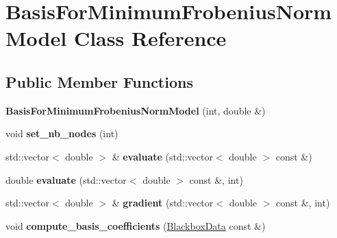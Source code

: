 \hypertarget{class_basis_for_minimum_frobenius_norm_model}{}\section{Basis\+For\+Minimum\+Frobenius\+Norm\+Model Class Reference}
\label{class_basis_for_minimum_frobenius_norm_model}
\subsection*{Public Member Functions}
\begin{DoxyCompactItemize}
\item 
{\bfseries Basis\+For\+Minimum\+Frobenius\+Norm\+Model} (int, double \&)\hypertarget{class_basis_for_minimum_frobenius_norm_model_a58e929c983576359f847821fc6701ed8}{}\label{class_basis_for_minimum_frobenius_norm_model_a58e929c983576359f847821fc6701ed8}

\item 
void {\bfseries set\+\_\+nb\+\_\+nodes} (int)\hypertarget{class_basis_for_minimum_frobenius_norm_model_ac3d25a58d68b00f1e71813ef3d55bfb5}{}\label{class_basis_for_minimum_frobenius_norm_model_ac3d25a58d68b00f1e71813ef3d55bfb5}

\item 
std\+::vector$<$ double $>$ \& {\bfseries evaluate} (std\+::vector$<$ double $>$ const \&)\hypertarget{class_basis_for_minimum_frobenius_norm_model_aee6e23df4a21b2d3e8c02d912a25f603}{}\label{class_basis_for_minimum_frobenius_norm_model_aee6e23df4a21b2d3e8c02d912a25f603}

\item 
double {\bfseries evaluate} (std\+::vector$<$ double $>$ const \&, int)\hypertarget{class_basis_for_minimum_frobenius_norm_model_a50c9c4b6700154f3e0b8cf92d31373b8}{}\label{class_basis_for_minimum_frobenius_norm_model_a50c9c4b6700154f3e0b8cf92d31373b8}

\item 
std\+::vector$<$ double $>$ \& {\bfseries gradient} (std\+::vector$<$ double $>$ const \&, int)\hypertarget{class_basis_for_minimum_frobenius_norm_model_a4f9b819941de881b2f1d8151d3d4622e}{}\label{class_basis_for_minimum_frobenius_norm_model_a4f9b819941de881b2f1d8151d3d4622e}

\item 
void {\bfseries compute\+\_\+basis\+\_\+coefficients} (\hyperlink{struct_blackbox_data}{Blackbox\+Data} const \&)\hypertarget{class_basis_for_minimum_frobenius_norm_model_a75b91064845d388857f95b50e5b78aac}{}\label{class_basis_for_minimum_frobenius_norm_model_a75b91064845d388857f95b50e5b78aac}


\end{DoxyCompactItemize}
